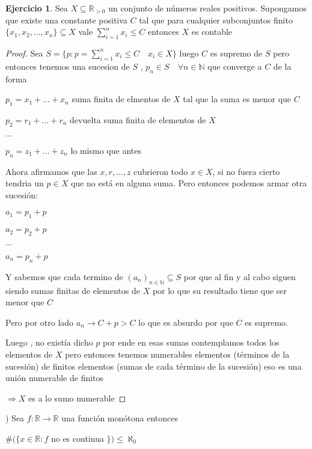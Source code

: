 \documentclass[12pt]{article}
\newcommand{\n}{\aleph_{0}}
\newcommand{\R}{\mathbb{R}}
\newcommand{\N}{\mathbb{N}}
\newcommand{\Ra}{\Rightarrow}
\newcommand{\ra}{\rightarrow}
\theoremstyle{definition}
\newtheorem{ej}{Ejercicio}
\begin{document}
\begin{ej} Sea $X \subseteq \R_{ >0 }$ un conjunto de números reales positivos. Supongamos que existe una constante positiva $C$ tal que para cualquier subconjuntos finito $\{x_{1},x_{2}, \dots ,x_{n}\} \subseteq X$ vale $\sum_{i =1}^{n} x_{i} \leq C$ entonces $X$ es contable

\begin{proof}
  Sea $S = \{p : p = \sum_{i = 1}^{n} x_{i} \leq C \quad x_{i} \in X\}$ luego $C$ es supremo de $S$ pero entonces tenemos una sucesion de $S$ , $p_{n} \in S \quad \forall n \in \N$ que converge a $C$ de la forma

  $p_{1} = x_{1} + \dots + x_{n}$ suma finita de elmentos de $X$ tal que la suma es menor que $C$

  $p_{2} = r_{1} + \dots + r_{n} $ devuelta suma finita de elementos de $X$

  $\dots$

  $p_{n} = z_{1} + \dots + z_{n}$ lo mismo que antes

  Ahora afirmamos que las $x,r, \dots ,z $ cubrieron todo $x \in X$, si no fuera cierto tendria un $p \in X $ que no está en alguna suma. Pero entonces podemos armar otra sucesión: 
  
  $a_{1} = p_{1} + p$
  
  $a_{2}=   p_{2}+p$
  
  $\dots$
  
  $a_{n} = p_{n} + p$

  Y sabemos que cada termino de $(a_{n})_{n \in \N} \subseteq S$ por que al fin y al cabo siguen siendo sumas finitas de elementos de $X$ por lo que su resultado tiene que ser menor que $C$

  Pero por otro lado $a_{n} \ra C + p > C$ lo que es absurdo por que $C$ es supremo. 

  Luego , no existía dicho $p$ por ende en esas sumas contemplamos todos los elementos de $X$ pero entonces tenemos numerables elementos (términos de la sucesión) de finitos elementos (sumas de cada término de la sucesión) eso es una unión numerable de finitos 

  $\Ra X$ es a lo sumo numerable

\end{proof}
\end{ej}
) Sea $f: \R \ra \R$ una función monótona entonces 
\begin{center} 
  $\# (\{x \in \R :f $ no es continua $\}) \leq \n$
\end{center}
\end{document}
